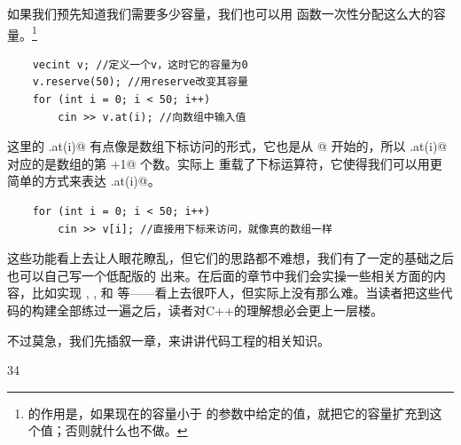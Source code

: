 如果我们预先知道我们需要多少容量，我们也可以用 \lstinline@reserve@ 函数一次性分配这么大的容量。\footnote{\lstinline@reserve@ 的作用是，如果现在的容量小于 \lstinline@reserve@ 的参数中给定的值，就把它的容量扩充到这个值；否则就什么也不做。}
\begin{lstlisting}
    vecint v; //定义一个v，这时它的容量为0
    v.reserve(50); //用reserve改变其容量
    for (int i = 0; i < 50; i++)
        cin >> v.at(i); //向数组中输入值
\end{lstlisting}\par
这里的 \lstinline@v.at(i)@ 有点像是数组下标访问的形式，它也是从 @ 开始的，所以 \lstinline@v.at(i)@ 对应的是数组的第 \lstinline@i+1@ 个数。实际上 \lstinline@vecint@ 重载了下标运算符，它使得我们可以用更简单的方式来表达 \lstinline@v.at(i)@。\par
\begin{lstlisting}
    for (int i = 0; i < 50; i++)
        cin >> v[i]; //直接用下标来访问，就像真的数组一样
\end{lstlisting}\par
这些功能看上去让人眼花瞭乱，但它们的思路都不难想，我们有了一定的基础之后也可以自己写一个低配版的 \lstinline@vecint@ 出来。在后面的章节中我们会实操一些相关方面的内容，比如实现 \lstinline@vector@, \lstinline@valarray@, \lstinline@string@ 和 \lstinline@stack@ 等——看上去很吓人，但实际上没有那么难。当读者把这些代码的构建全部练过一遍之后，读者对C++的理解想必会更上一层楼。\par
不过莫急，我们先插叙一章，来讲讲代码工程的相关知识。\par
34